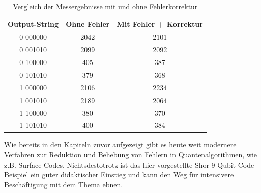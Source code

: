 \begin{table}[h!]
\centering
\begin{tabular}{|c|c|c|}
\hline
\textbf{Output-String} & \textbf{Ohne Fehler} & \textbf{Mit Fehler + Korrektur} \\
\hline
0 000000 & 2042 & 2101 \\
0 001010 & 2099 & 2092 \\
0 100000 & 405  & 387  \\
0 101010 & 379  & 368  \\
1 000000 & 2106 & 2234 \\
1 001010 & 2189 & 2064 \\
1 100000 & 380  & 370  \\
1 101010 & 400  & 384  \\
\hline
\end{tabular}
\caption{Vergleich der Messergebnisse mit und ohne Fehlerkorrektur}
\label{tab:shor_correction}
\end{table}


Wie bereits in den Kapiteln zuvor aufgezeigt gibt es heute weit modernere Verfahren zur Reduktion und Behebung von Fehlern in Quantenalgorithmen, wie z.B. Surface Codes. Nichtsdestotrotz ist das hier vorgestellte Shor-9-Qubit-Code Beispiel ein guter didaktischer Einstieg und kann den Weg für intensivere Beschäftigung mit dem Thema ebnen.

\printbibliography
